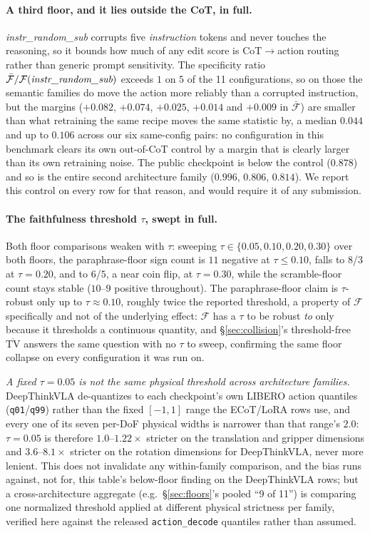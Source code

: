 \paragraph{A third floor, and it lies outside the CoT, in full.} \emph{instr\_random\_sub} corrupts five \emph{instruction} tokens and never touches the reasoning, so it bounds how much of any edit score is CoT$\to$action routing rather than generic prompt sensitivity. The specificity ratio $\bar{\mathcal{F}}/\mathcal{F}(\emph{instr\_random\_sub})$ exceeds $1$ on $5$ of the 11 configurations, so on those the semantic families do move the action more reliably than a corrupted instruction, but the margins ($+0.082$, $+0.074$, $+0.025$, $+0.014$ and $+0.009$ in $\bar{\mathcal{F}}$) are smaller than what retraining the same recipe moves the same statistic by, a median $0.044$ and up to $0.106$ across our six same-config pairs: no configuration in this benchmark clears its own out-of-CoT control by a margin that is clearly larger than its own retraining noise. The public checkpoint is below the control ($0.878$) and so is the entire second architecture family ($0.996$, $0.806$, $0.814$). We report this control on every row for that reason, and would require it of any submission.

\paragraph{The faithfulness threshold $\tau$, swept in full.} Both floor comparisons weaken with $\tau$: sweeping $\tau \in \{0.05, 0.10, 0.20, 0.30\}$ over both floors, the paraphrase-floor sign count is $11$ negative at $\tau \le 0.10$, falls to $8$/$3$ at $\tau{=}0.20$, and to $6$/$5$, a near coin flip, at $\tau{=}0.30$, while the scramble-floor count stays stable ($10$--$9$ positive throughout). The paraphrase-floor claim is $\tau$-robust only up to $\tau{\approx}0.10$, roughly twice the reported threshold, a property of $\mathcal{F}$ specifically and not of the underlying effect: $\mathcal{F}$ has a $\tau$ to be robust \emph{to} only because it thresholds a continuous quantity, and \S\ref{sec:collision}'s threshold-free $\overline{\text{TV}}$ answers the same question with no $\tau$ to sweep, confirming the same floor collapse on every configuration it was run on.

\emph{A fixed $\tau{=}0.05$ is not the same physical threshold across architecture families.} DeepThinkVLA de-quantizes to each checkpoint's own LIBERO action quantiles (\texttt{q01}/\texttt{q99}) rather than the fixed $[-1,1]$ range the ECoT/LoRA rows use, and every one of its seven per-DoF physical widths is narrower than that range's $2.0$: $\tau{=}0.05$ is therefore $1.0$--$1.22\times$ stricter on the translation and gripper dimensions and $3.6$--$8.1\times$ stricter on the rotation dimensions for DeepThinkVLA, never more lenient. This does not invalidate any within-family comparison, and the bias runs against, not for, this table's below-floor finding on the DeepThinkVLA rows; but a cross-architecture aggregate (e.g.\ \S\ref{sec:floors}'s pooled ``9 of 11'') is comparing one normalized threshold applied at different physical strictness per family, verified here against the released \texttt{action\_decode} quantiles rather than assumed.


